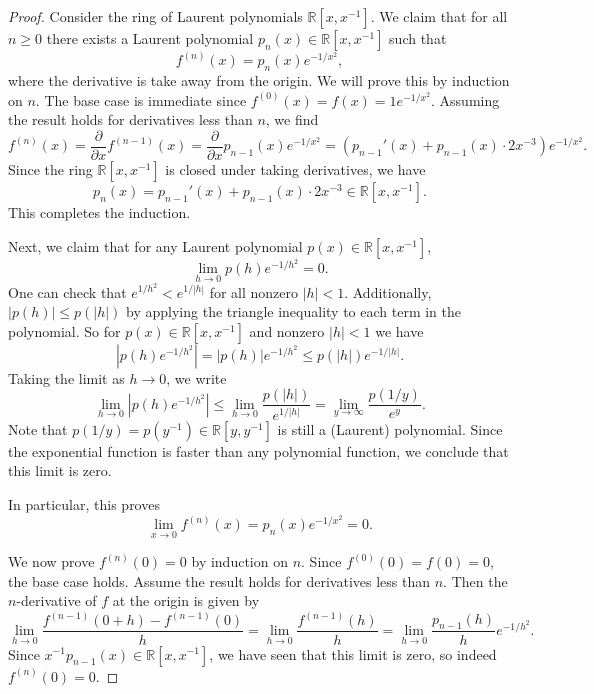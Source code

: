 \documentclass[12pt]{article}
\theoremstyle{definition}
\newcommand{\R}{\mathbb{R}}
\newcommand{\<}{\langle}
\renewcommand{\>}{\rangle}
\newcommand{\pdv}[2]{\frac{\partial #1}{\partial #2}}
\begin{document}
\begin{proof}
    Consider the ring of Laurent polynomials $\R[x, x^{-1}]$.
    We claim that for all $n \geq 0$ there exists a Laurent polynomial $p_n(x) \in \R[x, x^{-1}]$ such that
    \[
        f^{(n)}(x) = p_n(x) e^{-1/x^2},
    \]
    where the derivative is take away from the origin.
    We will prove this by induction on $n$.
    The base case is immediate since $f^{(0)}(x) = f(x) = 1 e^{-1/x^2}$.
    Assuming the result holds for derivatives less than $n$, we find
    \[
        f^{(n)}(x)
            = \pdv{}{x} f^{(n-1)}(x)
            = \pdv{}{x} p_{n-1}(x)e^{-1/x^2}
            = (p_{n-1}'(x) + p_{n-1}(x) \cdot 2x^{-3})e^{-1/x^2}.
    \]
    Since the ring $\R[x, x^{-1}]$ is closed under taking derivatives, we have
    \[
        p_n(x) = p_{n-1}'(x) + p_{n-1}(x) \cdot 2x^{-3} \in \R[x, x^{-1}].
    \]
    This completes the induction.

    Next, we claim that for any Laurent polynomial $p(x) \in \R[x, x^{-1}]$,
    \[
        \lim_{h \to 0} p(h)e^{-1/h^2} = 0.
    \]
    One can check that $e^{1/h^2} < e^{1/|h|}$ for all nonzero $|h| < 1$.
    Additionally, $|p(h)| \leq p(|h|)$ by applying the triangle inequality to each term in the polynomial.
    So for $p(x) \in \R[x, x^{-1}]$ and nonzero $|h| < 1$ we have
    \[
        |p(h)e^{-1/h^2}| = |p(h)|e^{-1/h^2} \leq p(|h|)e^{-1/|h|}.
    \]
    Taking the limit as $h \to 0$, we write
    \[
        \lim_{h \to 0} |p(h)e^{-1/h^2}|
            \leq \lim_{h \to 0} \frac{p(|h|)}{e^{1/|h|}}
            = \lim_{y \to \infty} \frac{p(1/y)}{e^y}.
    \]
    Note that $p(1/y) = p(y^{-1}) \in \R[y, y^{-1}]$ is still a (Laurent) polynomial.
    Since the exponential function is faster than any polynomial function, we conclude that this limit is zero.

    In particular, this proves
    \[
        \lim_{x \to 0} f^{(n)}(x) = p_n(x) e^{-1/x^2} = 0.
    \]
    

    We now prove $f^{(n)}(0) = 0$ by induction on $n$.
    Since $f^{(0)}(0) = f(0) = 0$, the base case holds.
    Assume the result holds for derivatives less than $n$.
    Then the $n$-derivative of $f$ at the origin is given by
    \[
        \lim_{h \to 0} \frac{f^{(n-1)}(0 + h) - f^{(n-1)}(0)}{h}
            = \lim_{h \to 0} \frac{f^{(n-1)}(h)}{h}
            = \lim_{h \to 0} \frac{p_{n-1}(h)}{h}e^{-1/h^2}.
    \]
    Since $x^{-1}p_{n-1}(x) \in \R[x, x^{-1}]$, we have seen that this limit is zero, so indeed $f^{(n)}(0) = 0$.
\end{proof}
\end{document}
